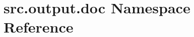 \hypertarget{namespacesrc_1_1output_1_1doc}{\section{src.\+output.\+doc Namespace Reference}
\label{namespacesrc_1_1output_1_1doc}
}
